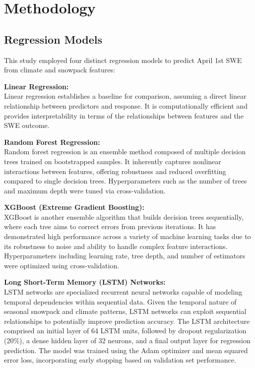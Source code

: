 \documentclass{article}
\begin{document}
\section{Methodology}

\subsection{Regression Models}

This study employed four distinct regression models to predict April 1st SWE from climate and snowpack features:

\textbf{Linear Regression:} \\
Linear regression establishes a baseline for comparison, assuming a direct linear relationship between predictors and response. It is computationally efficient and provides interpretability in terms of the relationships between features and the SWE outcome.

\textbf{Random Forest Regression:} \\
Random forest regression is an ensemble method composed of multiple decision trees trained on bootstrapped samples. It inherently captures nonlinear interactions between features, offering robustness and reduced overfitting compared to single decision trees. Hyperparameters such as the number of trees and maximum depth were tuned via cross-validation.

\textbf{XGBoost (Extreme Gradient Boosting):} \\
XGBoost is another ensemble algorithm that builds decision trees sequentially, where each tree aims to correct errors from previous iterations. It has demonstrated high performance across a variety of machine learning tasks due to its robustness to noise and ability to handle complex feature interactions. Hyperparameters including learning rate, tree depth, and number of estimators were optimized using cross-validation.

\textbf{Long Short-Term Memory (LSTM) Networks:} \\
LSTM networks are specialized recurrent neural networks capable of modeling temporal dependencies within sequential data. Given the temporal nature of seasonal snowpack and climate patterns, LSTM networks can exploit sequential relationships to potentially improve prediction accuracy. The LSTM architecture comprised an initial layer of 64 LSTM units, followed by dropout regularization (20\%), a dense hidden layer of 32 neurons, and a final output layer for regression prediction. The model was trained using the Adam optimizer and mean squared error loss, incorporating early stopping based on validation set performance.
\end{document}
